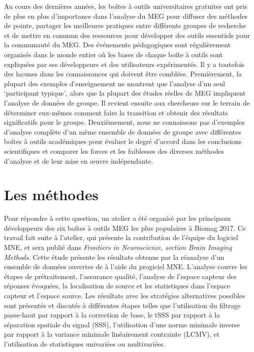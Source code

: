 Au cours des dernières années, les boîtes à outils universitaires gratuites ont pris de plus en plus d'importance dans l'analyse du MEG pour diffuser des méthodes de pointe, partager les meilleures pratiques entre différents groupes de recherche et de mettre en commun des ressources pour développer des outils essentiels pour la communauté du MEG. Des événements pédagogiques sont régulièrement organisés dans le monde entier où les bases de chaque boîte à outils sont expliquées par ses développeurs et des utilisateurs expérimentés. Il y a toutefois des lacunes dans les connaissances qui doivent être comblées. Premièrement, la plupart des exemples d'enseignement ne montrent que l'analyse d'un seul ‘participant typique’, alors que la plupart des études réelles de MEG impliquent l'analyse de données de groupe. Il revient ensuite aux chercheurs sur le terrain de déterminer eux-mêmes comment faire la transition et obtenir des résultats significatifs pour le groupe. Deuxièmement, nous ne connaissons pas d'exemples d'analyse complète d'un même ensemble de données de groupe avec différentes boîtes à outils académiques pour évaluer le degré d'accord dans les conclusions scientifiques et comparer les forces et les faiblesses des diverses méthodes d'analyse et de leur mise en œuvre indépendante.

\section*{Les méthodes}
Pour répondre à cette question, un atelier a été organisé par les principaux développeurs des six boîtes à outils MEG les plus populaires à Biomag 2017. Ce travail fait suite à l'atelier, qui présente la contribution de l'équipe du logiciel MNE, et sera publié dans \emph{Frontiers in Neuroscience, section Brain Imaging Methods}. Cette étude présente les résultats obtenus par la réanalyse d'un ensemble de données ouvertes de \citet{wakeman2015multi} à l'aide du progiciel MNE. L'analyse couvre les étapes de prétraitement, l'assurance qualité, l'analyse de l'espace capteur des réponses évoquées, la localisation de source et les statistiques dans l'espace capteur et l'espace source. Les résultats avec les stratégies alternatives possibles sont présentés et discutés à différentes étapes telles que l'utilisation du filtrage passe-haut par rapport à la correction de base, le tSSS par rapport à la séparation spatiale du signal (SSS), l'utilisation d'une norme minimale inverse par rapport à la variance minimale linéairement contrainte (LCMV), et l'utilisation de statistiques univariées ou multivariées.

